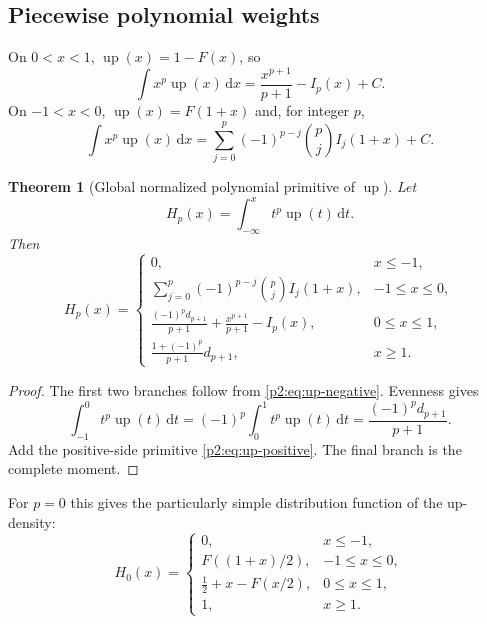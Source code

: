 \documentclass[11pt,oneside]{article}
\newtheorem{theorem}{Theorem}[section]
\theoremstyle{definition}
\theoremstyle{remark}
\newcommand{\Up}{\operatorname{up}}
\newcommand{\dd}{\,\mathrm d}
\newcommand{\1}{\mathbf 1}
\begin{document}
\subsection{Piecewise polynomial weights}
On $0<x<1$, $\Up(x)=1-F(x)$, so
\begin{equation}
 \int x^p\Up(x)\dd x=\frac{x^{p+1}}{p+1}-I_p(x)+C.        \label{p2:eq:up-positive}
\end{equation}
On $-1<x<0$, $\Up(x)=F(1+x)$ and, for integer $p$,
\begin{equation}
 \int x^p\Up(x)\dd x
 =\sum_{j=0}^{p}(-1)^{p-j}\binom pj I_j(1+x)+C.           \label{p2:eq:up-negative}
\end{equation}

\begin{theorem}[Global normalized polynomial primitive of $\Up$]
\label{p2:thm:up-global-primitive}
Let
\begin{equation}
 H_p(x)=\int_{-\infty}^{x}t^p\Up(t)\dd t.                 \label{p2:eq:Hp-def}
\end{equation}
Then
\begin{equation}
 H_p(x)=
 \begin{cases}
 0,&x\le-1,\\[2pt]
 \displaystyle\sum_{j=0}^{p}(-1)^{p-j}\binom pjI_j(1+x),
   &-1\le x\le0,\\[8pt]
 \displaystyle\frac{(-1)^pd_{p+1}}{p+1}
 +\frac{x^{p+1}}{p+1}-I_p(x),&0\le x\le1,\\[9pt]
 \displaystyle\frac{1+(-1)^p}{p+1}d_{p+1},&x\ge1.
 \end{cases}                                               \label{p2:eq:Hp-piecewise}
\end{equation}
\end{theorem}

\begin{proof}
The first two branches follow from \eqref{p2:eq:up-negative}.  Evenness gives
\[
 \int_{-1}^{0}t^p\Up(t)\dd t
 =(-1)^p\int_0^1t^p\Up(t)\dd t
 =\frac{(-1)^pd_{p+1}}{p+1}.
\]
Add the positive-side primitive \eqref{p2:eq:up-positive}.  The final branch is
the complete moment.
\end{proof}

For $p=0$ this gives the particularly simple distribution function of the
up-density:
\begin{equation}
 H_0(x)=
 \begin{cases}
 0,&x\le-1,\\
 F((1+x)/2),&-1\le x\le0,\\
 \frac12+x-F(x/2),&0\le x\le1,\\
 1,&x\ge1.
 \end{cases}                                               \label{p2:eq:up-cdf}
\end{equation}
\end{document}
